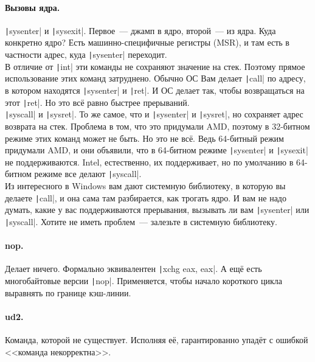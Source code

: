 \documentclass{article}
\begin{document}
    \paragraph{Вызовы ядра.}
    \texttt|sysenter| и \texttt|sysexit|. Первое~--- джамп в ядро, второй~--- из ядра. Куда конкретно ядро? Есть машинно-специфичные регистры (MSR), и там есть в частности адрес, куда \texttt|sysenter| переходит.\\
    В отличие от \texttt|int| эти команды не сохраняют значение на стек. Поэтому прямое использование этих команд затруднено. Обычно ОС Вам делает \texttt|call| по адресу, в котором находятся \texttt|sysenter| и \texttt|ret|. И ОС делает так, чтобы возвращаться на этот \texttt|ret|. Но это всё равно быстрее прерываний.\\
    \texttt|syscall| и \texttt|sysret|. То же самое, что и \texttt|sysenter| и \texttt|sysret|, но сохраняет адрес возврата на стек. Проблема в том, что это придумали AMD, поэтому в 32-битном режиме этих команд может не быть. Но это не всё. Ведь 64-битный режим придумали AMD, и они объявили, что в 64-битном режиме \texttt|sysenter| и \texttt|sysexit| не поддерживаются. Intel, естественно, их поддерживает, но по умолчанию в 64-битном режиме все делают \texttt|syscall|.\\
    Из интересного в Windows вам дают системную библиотеку, в которую вы делаете \texttt|call|, и она сама там разбирается, как трогать ядро. И вам не надо думать, какие у вас поддерживаются прерывания, вызывать ли вам \texttt|sysenter| или \texttt|syscall|. Хотите не иметь проблем~--- залезьте в системную библиотеку.
    \paragraph{nop.}
    Делает ничего. Формально эквивалентен \texttt|xchg eax, eax|. А ещё есть многобайтовые версии \texttt|nop|. Применяется, чтобы начало короткого цикла выравнять по границе кэш-линии.
    \paragraph{ud2.}
    Команда, которой не существует. Исполняя её, гарантированно упадёт с ошибкой <<команда некорректна>>.
\end{document}
